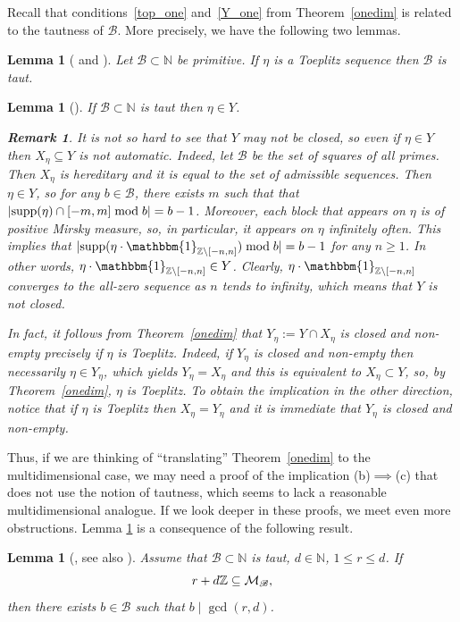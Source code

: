 \documentclass[leqno,a4paper,12pt]{article}
\newtheorem{Lemma}[Th]{Lemma}
\theoremstyle{definition}
\newtheorem{Remark}[Th]{Remark}
\newcommand{\divides}{\mid}
\newcommand{\cM}{{\cal M}}
\newcommand{\Z}{{\mathbb{Z}}}
\newcommand{\N}{{\mathbb{N}}}
\newcommand{\sB}{\mathscr{B}}
\newcommand{\raz}{\mathbbm{1}}
\def\supp{{\rm supp }}
\begin{document}
Recall that conditions~\eqref{top_one} and~\eqref{Y_one} from Theorem~\ref{onedim} is related to the tautness of $\sB$. More precisely, we have the following two lemmas.
\begin{Lemma}[{\cite[Proposition 5.3]{MR3731019} and \cite[Lemma 3.6]{MR3947636}}]\label{taut}
Let $\mathscr{B}\subset\N$ be primitive. If $\eta$ is a Toeplitz sequence then $\mathscr{B}$ is taut.
\end{Lemma}
\begin{Lemma}[{\cite[Corollary 4.32]{MR3803141}}]\label{inY}
If $\mathscr{B}\subset\N$ is taut then $\eta\in Y$.
\begin{Remark}
It is not so hard to see that $Y$ may not be closed, so even if $\eta\in Y$ then $X_\eta\subseteq Y$ is not automatic. Indeed, let $\mathscr{B}$ be the set of squares of all primes. Then $X_\eta$ is hereditary and it is equal to the set of admissible sequences. Then $\eta\in Y$, so for any  $b\in\sB$, there exists $m$ such that that $|\supp(\eta) \cap[-m,m] \bmod b|=b-1$. Moreover, each block that appears on $\eta$ is of positive Mirsky measure, so, in particular, it appears on $\eta$ infinitely often. This implies that $|\supp(\eta \cdot\raz_{\Z\setminus [-n,n]}) \bmod b|=b-1$ for any $n\geq 1$. In other words, $\eta \cdot\raz_{\Z\setminus [-n,n]}\in Y$. Clearly, $\eta \cdot\raz_{\Z\setminus [-n,n]}$ converges to the all-zero sequence as $n$ tends to infinity, which means that $Y$ is not closed.

In fact, it follows from Theorem~\ref{onedim} that $Y_\eta:=Y\cap X_\eta$ is closed and non-empty precisely if $\eta$ is Toeplitz. Indeed, if $Y_\eta$ is closed and non-empty then necessarily $\eta\in Y_\eta$, which yields $Y_\eta=X_\eta$ and this is equivalent to $X_\eta\subset Y$, so, by Theorem~\ref{onedim}, $\eta$ is Toeplitz. To obtain the implication in the other direction, notice that if $\eta$ is Toeplitz then $X_\eta=Y_\eta$ and it is immediate that $Y_\eta$ is closed and non-empty.
\end{Remark}
\end{Lemma}
Thus, if we are thinking of ``translating'' Theorem~\ref{onedim} to the multidimensional case, we may need a proof of the implication (b)$\implies$(c) that does not use the notion of tautness, which seems to lack a reasonable multidimensional analogue. If we look deeper in these proofs, we meet even more obstructions. Lemma \ref{inY} is a consequence of the following result.
\begin{Lemma}[{\cite[Proposition 4.31]{MR3803141}}, see also {\cite[Proposition 2.4]{DKK}}]
Assume that $\mathscr{B}\subset \N$ is taut, $d\in\N$, $1\leq r\leq d$. If
\[
r+d\Z\subseteq \cM_\sB,
\]
then there exists $b\in\sB$ such that $b\divides\gcd(r,d)$.
\end{Lemma}
\end{document}
